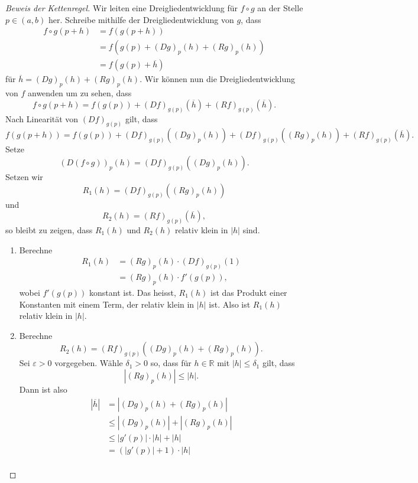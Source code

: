 \documentclass[../main.tex]{subfiles}
\begin{document}
\begin{proof}[Beweis der Kettenregel]
  Wir leiten eine Dreigliedentwicklung
  für $f \circ g$ an der Stelle $p \in (a, b)$ her.
  Schreibe mithilfe der Dreigliedentwicklung
  von $g$, dass
  \begin{align*}
    f \circ g(p + h)
    &= f(g(p+h))  \\
    &= f(g(p) + {(Dg)}_p(h) + {(Rg)}_p(h)) \\
    &= f(g(p) + \overline h)
  \end{align*}
  für $\overline h = {(Dg)}_p(h) + {(Rg)}_p(h)$.
  Wir können nun die Dreigliedentwicklung von $f$
  anwenden um zu sehen, dass
  \[
    f \circ g(p + h) = f(g(p)) + {(Df)}_{g(p)}(\overline h)
    + {(Rf)}_{g(p)}(\overline h).
  \]
  Nach Linearität von ${(Df)}_{g(p)}$ gilt, dass
  \[
    f(g(p+h)) = f(g(p)) + {(Df)}_{g(p)}(
    {(Dg)}_p(h))
    + {(Df)}_{g(p)}({(Rg)}_p(h))
    + {(Rf)}_{g(p)}(\overline h).
  \]
  Setze
  \[
    {(D(f \circ g))}_p(h) = {(Df)}_{g(p)}({(Dg)}_p(h)).
  \]
  Setzen wir
  \[
    R_1(h) = {(Df)}_{g(p)}({(Rg)}_p(h))
  \]
  und
  \[
    R_2(h) = {(Rf)}_{g(p)}(\overline h),
  \]
  so bleibt zu zeigen, dass $R_1(h)$
  und $R_2(h)$ relativ klein
  in $|h|$ sind.
  \begin{enumerate}[(1)]
    \item Berechne
      \begin{align*}
        R_1(h)
        & = {(Rg)}_p(h) \cdot {(Df)}_{g(p)}(1)\\
        & = {(Rg)}_p(h) \cdot f'(g(p)),
      \end{align*}
      wobei $f'(g(p))$ konstant ist.
      Das heisst, $R_1(h)$ ist das
      Produkt einer Konstanten mit
      einem Term, der relativ klein in $|h|$ ist.
      Also ist $R_1(h)$ relativ klein in $|h|$.
    \item Berechne
      \[
        R_2(h)
        = {(Rf)}_{g(p)}({(Dg)}_p(h) + {(Rg)}_p(h)).
      \]
      Sei $\varepsilon > 0$ vorgegeben. Wähle
      $\delta_1 > 0$ so, dass
      für $h \in \mathbb{R}$ mit $|h| \leq \delta_1$ gilt,
      dass
      \[
        |{(Rg)}_p(h)| \leq |h|.
      \]
      Dann ist also
      \begin{align*}
         |\overline h|
         & = |{(Dg)}_p(h) + {(Rg)}_p(h)|\\
         & \leq |{(Dg)}_p(h)| + |{(Rg)}_p(h)| \\
         &\leq |g'(p)| \cdot |h| + |h| \\
         &= (|g'(p)| + 1) \cdot |h| \\

\end{align*}
\end{enumerate}
\end{proof}
\end{document}
